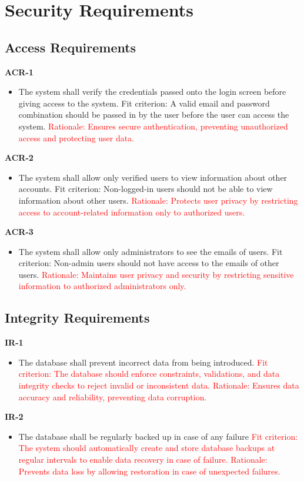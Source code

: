 \documentclass[12pt]{article}
\begin{document}
\section{Security Requirements}
\subsection{Access Requirements}
\textbf{ACR-1}
\begin{itemize}
    \item The system shall verify the credentials passed onto the login screen before giving access to the system. \hfill \break
    Fit criterion: A valid email and password combination should be passed in by the user before the user can access the system.
    \hfill \break
    \textcolor{red} {Rationale: Ensures secure authentication, preventing unauthorized access and protecting user data.}
\end{itemize}
\textbf{ACR-2}
\begin{itemize}
    \item The system shall allow only verified users to view information about other accounts. \hfill \break
    Fit criterion: Non-logged-in users should not be able to view information about other users.
    \hfill \break
    \textcolor{red} {Rationale: Protects user privacy by restricting access to account-related information only to authorized users.}
\end{itemize}
\textbf{ACR-3}
\begin{itemize}
    \item The system shall allow only administrators to see the emails of users. \hfill \break
    Fit criterion: Non-admin users should not have access to the emails of other users.
    \hfill \break
    \textcolor{red} {Rationale: Maintains user privacy and security by restricting sensitive information to authorized administrators only.}
\end{itemize}

\subsection{Integrity Requirements}
\textbf{IR-1}
\begin{itemize}
    \item The database shall prevent incorrect data from being introduced.
    \hfill \break
    \textcolor{red} {Fit criterion: The database should enforce constraints, validations, and data integrity checks to reject invalid or inconsistent data.}
    \hfill \break
    \textcolor{red} {Rationale: Ensures data accuracy and reliability, preventing data corruption.}
\end{itemize}
\textbf{IR-2}
\begin{itemize}
    \item The database shall be regularly backed up in case of any failure
    \hfill \break
    \textcolor{red} {Fit criterion: The system should automatically create and store database backups at regular intervals to enable data recovery in case of failure.}
    \hfill \break
    \textcolor{red} {Rationale: Prevents data loss by allowing restoration in case of unexpected failures.}
\end{itemize}
\end{document}
